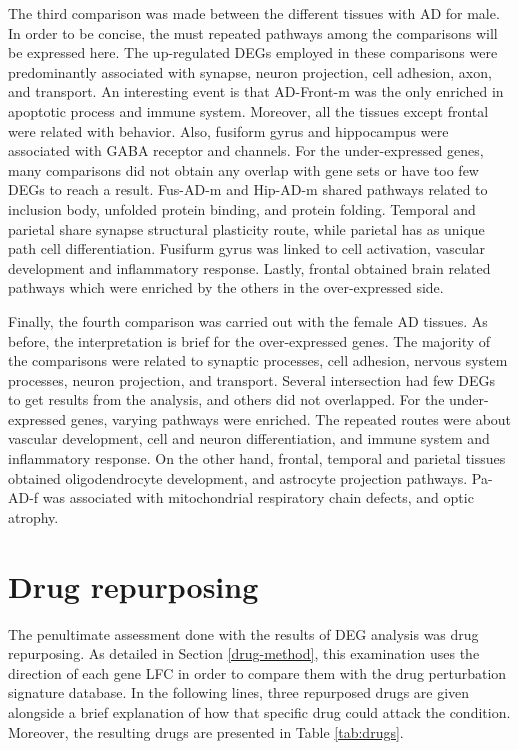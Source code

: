 The third comparison was made between the different tissues with AD for male. In order to be concise, the must repeated pathways among the comparisons will be expressed here. The up-regulated DEGs employed in these comparisons were predominantly associated with synapse, neuron projection, cell adhesion, axon, and transport. An interesting event is that AD-Front-m was the only enriched in apoptotic process and immune system. Moreover, all the tissues except frontal were related with behavior. Also, fusiform gyrus and hippocampus were associated with GABA receptor and channels. For the under-expressed genes, many comparisons did not obtain any overlap with gene sets or have too few DEGs to reach a result. Fus-AD-m and Hip-AD-m shared pathways related to inclusion body, unfolded protein binding, and protein folding. Temporal and parietal share synapse structural plasticity route, while parietal has as unique path cell differentiation. Fusifurm gyrus was linked to cell activation, vascular development and inflammatory response. Lastly, frontal obtained brain related pathways which were enriched by the others in the over-expressed side.

Finally, the fourth comparison was carried out with the female AD tissues. As before, the interpretation is brief for the over-expressed genes. The majority of the comparisons were related to synaptic processes, cell adhesion, nervous system processes, neuron projection, and transport. Several intersection had few DEGs to get results from the analysis, and others did not overlapped. For the under-expressed genes, varying pathways were enriched. The repeated routes were about vascular development, cell and neuron differentiation, and immune system and inflammatory response. On the other hand, frontal, temporal and parietal tissues obtained oligodendrocyte development, and astrocyte projection pathways. Pa-AD-f was associated with mitochondrial respiratory chain defects, and optic atrophy.


\section{Drug repurposing}

The penultimate assessment done with the results of DEG analysis was drug repurposing. As detailed in Section \ref{drug-method}, this examination uses the direction of each gene LFC in order to compare them with the drug perturbation signature database. In the following lines, three repurposed drugs are given alongside a brief explanation of how that specific drug could attack the condition. Moreover, the resulting drugs are presented in Table \ref{tab:drugs}.

